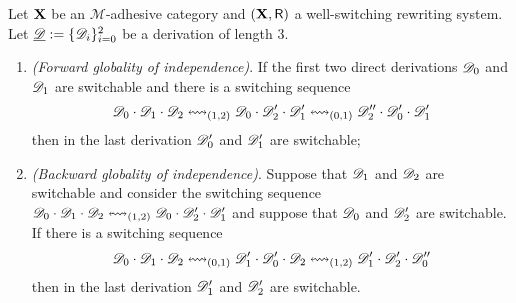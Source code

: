 \begin{lemma}
	\label{lem:indep-global-left}
	Let $\textbf {\textup{X}}$ be an $\mathcal{M}$-adhesive category and $(\textbf {\textup{X}},\mathsf{R})$ a
	well-switching rewriting system.  Let $\underline{\mathscr{D}}:=\{\mathscr{D}_i\}_{i=0}^2$  be a derivation of length $3$.
	\begin{enumerate}
		\item
		\label{lem:indep-global-left:1} \emph{(Forward globality of independence)}.
		If the first two direct derivations $\mathscr{D}_0$ and $\mathscr{D}_1$ are switchable and there is a
		switching sequence
		\[\mathscr{D}_0\cdot \mathscr{D}_1 \cdot \mathscr{D}_2 \mathrel{{\leftrightsquigarrow}_{(1,2)}}
		\mathscr{D}_0 \cdot \mathscr{D}_2' \cdot \mathscr{D}_1' \mathrel{{\leftrightsquigarrow}_{(0,1)}}
		\mathscr{D}_2'' \cdot \mathscr{D}_0' \cdot \mathscr{D}_1'\]
		then
		in the last derivation $\mathscr{D}_0'$ and $\mathscr{D}_1'$ are switchable;
		
		\item
		\label{lem:indep-global-left:2} \emph{(Backward globality of independence)}.
		Suppose  that $\mathscr{D}_1$ and $\mathscr{D}_2$ are switchable and consider the switching sequence  $\mathscr{D}_0\cdot \mathscr{D}_1 \cdot \mathscr{D}_2 \mathrel{{\leftrightsquigarrow}_{(1,2)}}
		\mathscr{D}_0 \cdot \mathscr{D}_2' \cdot \mathscr{D}_1'$ and suppose that $\mathscr{D}_0$ and $\mathscr{D}_2'$ are switchable.  If there
		is a switching sequence
		\[\mathscr{D}_0\cdot \mathscr{D}_1 \cdot \mathscr{D}_2 \mathrel{{\leftrightsquigarrow}_{(0,1)}}
		\mathscr{D}_1' \cdot \mathscr{D}_0' \cdot \mathscr{D}_2 \mathrel{{\leftrightsquigarrow}_{(1,2)}}
		\mathscr{D}_1' \cdot \mathscr{D}_2' \cdot \mathscr{D}_0''\] 
		then in the last derivation $\mathscr{D}_1'$ and $\mathscr{D}_2'$ are switchable.
	\end{enumerate}
\end{lemma}

